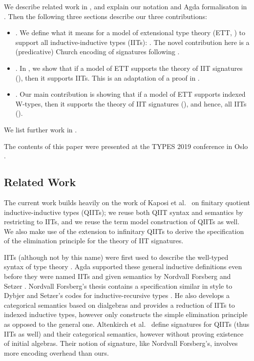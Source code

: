 \documentclass[a4paper,UKenglish,cleveref, autoref]{lipics-v2019}
\begin{document}
We describe related work in , and explain our
notation and Agda formalisaton in . Then the
following three sections describe our three contributions:
\begin{itemize}
\item {}. We define what it means for a
  model of extensional type theory (ETT, ) to support
  all inductive-inductive types (IITs): . The novel
  contribution here is a (predicative) Church encoding of signatures
  following \cite{DBLP:conf/lics/AwodeyFS18}.
\item {}. In , we show that if a
  model of ETT supports the theory of IIT signatures
  (), then it supports IITs. This is an adaptation of a proof in
  \cite{Kaposi:2019:CQI:3302515.3290315}.
\item {}. Our main contribution is showing that if a
  model of ETT supports indexed W-types, then it supports the theory
  of IIT signatures (), and hence, all IITs ().
\end{itemize}
We list further work in .

The contents of this paper were presented at the TYPES 2019 conference
in Oslo \cite{types}.

\subsection{Related Work}
\label{sec:related}

The current work builds heavily on the work of Kaposi et al.\
\cite{Kaposi:2019:CQI:3302515.3290315} on finitary quotient
inductive-inductive types (QIITs); we reuse both QIIT syntax and
semantics by restricting to IITs, and we reuse the term model
construction of QIITs as well. We also make use of the extension to
infinitary QIITs \cite{large_inf_qiit} to derive the specification of
the elimination principle for the theory of IIT signatures.

IITs (although not by this name) were first used to describe the
well-typed syntax of type theory \cite{nisse,chapman09eatitself}. Agda
supported these general inductive definitions even before they were
named IITs and given semantics by Nordvall Forsberg and Setzer
\cite{nordvallforsbergSetzer2010inductiveinductive}. Nordvall
Forsberg's thesis \cite{forsberg-phd} contains a specification similar
in style to Dybjer and Setzer's codes for inductive-recursive types
\cite{Dybjer99afinite}. He also develops a categorical semantics based
on dialgebras and provides a reduction of IITs to indexed inductive
types, however only constructs the simple elimination principle as
opposed to the general one. Altenkirch et al.\ \cite{gabe} define
signatures for QIITs (thus IITs as well) and their categorical
semantics, however without proving existence of initial
algebras. Their notion of signature, like Nordvall Forsberg's,
involves more encoding overhead than ours.
\end{document}
